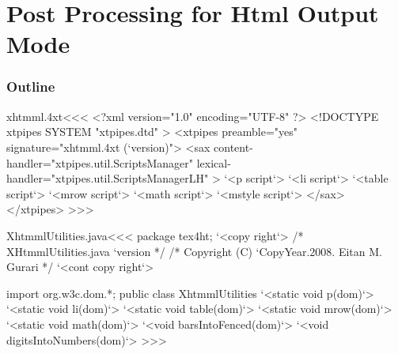 \documentclass{article}
\begin{document}

\newcount\tmpcnt  \tmpcnt\time  \divide{}
\edef\temp{\the\tmpcnt}
\multiply{} \advance\tmpcnt  \time

\edef\version{\the\year-\ifnum \month<10 0\fi
  \the\month-\ifnum \day<10 0\fi\the\day
   -\ifnum \temp<10 0\fi \temp
   :\ifnum \tmpcnt<10 0\fi\the\tmpcnt}

\def\CopyYear.#1.{%
   \ifnum #1=\year #1\space\space\space\space\space\space
    \else          #1--\the\year\fi
}






\part{Post Processing for Html Output Mode}


\section{Outline}



\<xhtmml.4xt\><<<
<?xml version="1.0" encoding="UTF-8" ?>
<!DOCTYPE xtpipes SYSTEM "xtpipes.dtd" >
<xtpipes preamble="yes" signature="xhtmml.4xt (`version)">
   <sax content-handler="xtpipes.util.ScriptsManager" 
        lexical-handler="xtpipes.util.ScriptsManagerLH" >
     `<p script`>
     `<li script`>
     `<table script`>
     `<mrow script`>
     `<math script`>
     `<mstyle script`>
   </sax>
</xtpipes>
>>>





\<XhtmmlUtilities.java\><<<
package tex4ht;
`<copy right`>
/* XHtmmlUtilities.java                      `version */
/* Copyright (C) `CopyYear.2008.    Eitan M. Gurari            */
`<cont copy right`>

import org.w3c.dom.*;
public class XhtmmlUtilities {
  `<static void p(dom)`>
  `<static void li(dom)`>
  `<static void table(dom)`>
  `<static void mrow(dom)`>
  `<static void math(dom)`>
  `<void barsIntoFenced(dom)`>
  `<void digitsIntoNumbers(dom)`>
}
>>>
\end{document}
